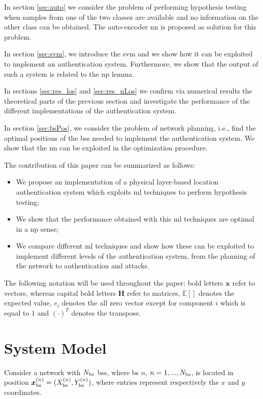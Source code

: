 \documentclass[draftcls,onecolumn,12pt]{IEEEtran}
\begin{document}
In section \ref{sec:auto} we consider the problem of performing hypothesis testing when samples from one of the two classes are available and no information on the other class can be obtained. The auto-encoder \ac{nn} is proposed as solution for this problem.

In section \ref{sec:svm}, we introduce the \ac{svm} and we show how it can be exploited to implement an authentication system. Furthermore, we show that the output of such a system is related to the \ac{np} lemma.

In sections \ref{sec:res_los} and \ref{sec:res_nLos} we confirm via numerical results the theoretical parts of the previous section and investigate the performance of the different implementations of the authentication system.

In section \ref{sec:bsPos}, we consider the problem of network planning, i.e., find the optimal positions of the \acp{bs} needed to implement the authentication system. We show that the \ac{nn} can be exploited in the optimization procedure.

The contribution of this paper can be summarized as follows:
\begin{itemize}
    \item We propose an implementation of a physical layer-based location authentication system which exploits \ac{ml} techniques to perform hypothesis testing;
    \item We show that the performance obtained with this \ac{ml} techniques are optimal in a \ac{np} sense;
    \item We compare different \ac{ml} techniques and show how these can be exploited to implement different levels of the authentication system, from the planning of the network to authentication and attacks.
\end{itemize}

The following notation will be used throughout the paper: bold letters $\bm{x}$ refer to vectors, whereas capital bold letters $\bm{H}$ refer to matrices, $\mathbb{E}[]$ denotes the expected value, $e_i$ denotes the all zero vector except for component $i$ which is equal to $1$ and $(\cdot)^T$ denotes the transpose.

\section{System Model}
Consider a network with $N_{\rm bs}$ \acp{bs}, where \ac{bs} $n$, $n=1,...,N_{\rm bs}$, is located in position $\bm{x}_{\rm bs}^{(n)} =(X_{\rm bs}^{(n)},Y_{\rm bs}^{(n)})$, where entries represent respectively the $x$ and $y$ coordinates. 
\end{document}
